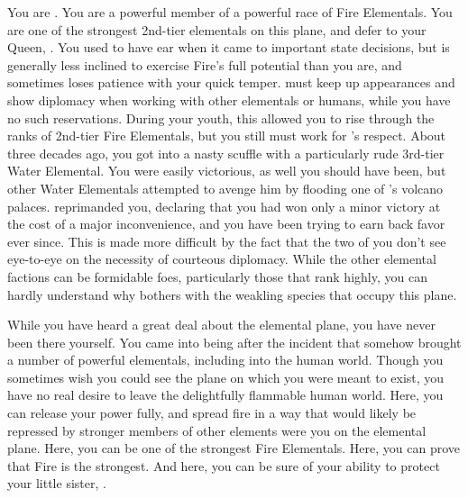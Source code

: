 \documentclass[char]{elementals}
\begin{document}
\name{\cPyro{}}

You are \cPyro{\intro}.  You are a powerful member of a powerful race of Fire Elementals.  You are one of the strongest 2nd-tier elementals on this plane, and defer to your Queen, \cQueen{\intro}.  You used to have \cQueen{\their} ear when it came to important state decisions, but \cQueen{\they} is generally less inclined to exercise Fire's full potential than you are, and sometimes loses patience with your quick temper.  \cQueen{\they} must keep up appearances and show diplomacy when working with other elementals or humans, while you have no such reservations.  During your youth, this allowed you to rise through the ranks of 2nd-tier Fire Elementals, but you still must work for \cQueen{}'s respect.  About three decades ago, you got into a nasty scuffle with a particularly rude 3rd-tier Water Elemental.  You were easily victorious, as well you should have been, but other Water Elementals attempted to avenge him by flooding one of \cQueen{}'s volcano palaces.  \cQueen{} reprimanded you, declaring that you had won only a minor victory at the cost of a major inconvenience, and you have been trying to earn back \cQueen{\their} favor ever since.  This is made more difficult by the fact that the two of you don't see eye-to-eye on the necessity of courteous diplomacy.  While the other elemental factions can be formidable foes, particularly those that rank highly, you can hardly understand why \cQueen{} bothers with the weakling species that occupy this plane.

While you have heard a great deal about the elemental plane, you have never been there yourself.  You came into being after the incident that somehow brought a number of powerful elementals, including \cQueen{} into the human world.  Though you sometimes wish you could see the plane on which you were meant to exist, you have no real desire to leave the delightfully flammable human world.  Here, you can release your power fully, and spread fire in a way that would likely be repressed by stronger members of other elements were you on the elemental plane.  Here, you can be one of the strongest Fire Elementals.  Here, you can prove that Fire is the strongest.  And here, you can be sure of your ability to protect your little sister, \cJuliet{\intro}.
\end{document}
